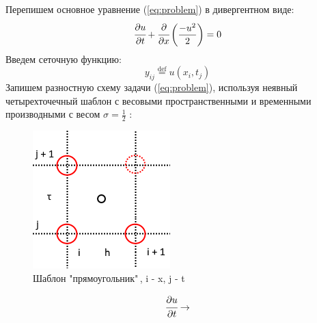 \documentclass[12pt]{article}
\def\dd#1#2{\cfrac{\partial#1}{\partial#2}}
\begin{document}
		Перепишем основное уравнение (\ref{eq:problem}) в дивергентном виде:
		$$\dd{u}t + \dd{}x\left(\frac{-u^2}{2}\right) = 0$$
		Введем сеточную функцию:
		$$y_{ij} \overset{\mathrm{def}}{=} u(x_i, t_j)$$
		Запишем разностную схему задачи (\ref{eq:problem}), используя неявный четырехточечный шаблон с весовыми пространственными и временными производными с весом $\sigma = \frac{1}{2}$ :
		\begin{figure}[h!]
			\begin{center}
				\includegraphics[width=0.5\linewidth]{template}
				\caption{Шаблон "прямоугольник"\,, i - x, j - t}
			\end{center}
		\end{figure}
		$$\dd{u}t \to $$
		
\end{document}
